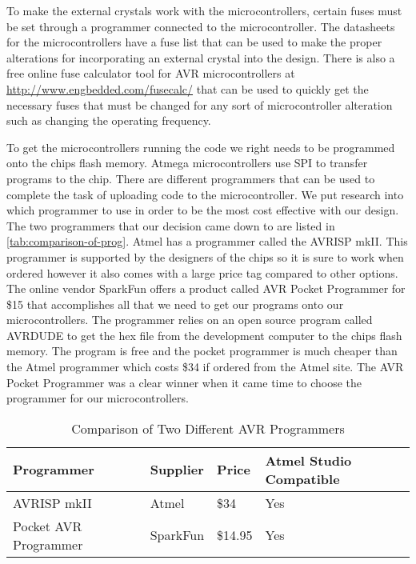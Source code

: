 To make the external crystals work with the microcontrollers, certain fuses
must be set through a programmer connected to the microcontroller. The
datasheets for the microcontrollers have a fuse list that can be used to make
the proper alterations for incorporating an external crystal into the design.
There is also a free online fuse calculator tool for AVR microcontrollers at
\url{http://www.engbedded.com/fusecalc/} that can be used to quickly get the
necessary fuses that must be changed for any sort of microcontroller alteration
such as changing the operating frequency.

To get the microcontrollers running the code we right needs to be programmed
onto the chips flash memory. Atmega microcontrollers use SPI to transfer
programs to the chip. There are different programmers that can be used to
complete the task of uploading code to the microcontroller. We put research
into which programmer to use in order to be the most cost effective with our
design. The two programmers that our decision came down to are listed in
\autoref{tab:comparison-of-prog}. Atmel has a programmer called the AVRISP mkII. This
programmer is supported by the designers of the chips so it is sure to work
when ordered however it also comes with a large price tag compared to other
options. The online vendor SparkFun offers a product called AVR Pocket
Programmer for \$15 that accomplishes all that we need to get our programs onto
our microcontrollers. The programmer relies on an open source program called
AVRDUDE to get the hex file from the development computer to the chips flash
memory. The program is free and the pocket programmer is much cheaper than the
Atmel programmer which costs \$34 if ordered from the Atmel site. The AVR
Pocket Programmer was a clear winner when it came time to choose the programmer
for our microcontrollers.

\begin{table}[H]
\centering
\begin{tabular}{|l|l|l|l|}
\hline
{\color{black} Programmer} &
{\color{black} Supplier} &
{\color{black} Price} &
{\color{black} Atmel Studio Compatible}\\\hline
{\color{black} AVRISP mkII} &
{\color{black} Atmel} &
{\color{black} \$34} &
{\color{black} Yes}\\\hline
{\color{black} Pocket AVR Programmer} &
{\color{black} SparkFun} &
{\color{black} \$14.95} &
{\color{black} Yes}\\\hline
\end{tabular}
\caption{Comparison of Two Different AVR Programmers}
\label{tab:comparison-of-prog}
\end{table}

